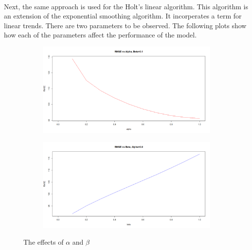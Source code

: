 \documentclass[12pt]{article}
\begin{document}
\paragraph{}
Next, the same approach is used for the Holt's linear algorithm. This algorithm is an extension of the exponential smoothing algorithm. It incorperates a term for linear trends. There are two parameters to be observed. The following plots show how each of the parameters affect the performance of the model.
\begin{figure}[H]
  \centering
  \begin{subfigure}[b]{1\linewidth}
    \includegraphics[width=\linewidth]{figure20-1.png}
  \end{subfigure}
  \begin{subfigure}[b]{1\linewidth}
    \includegraphics[width=\linewidth]{figure20-2.png}
  \end{subfigure}
  \caption{The effects of $\alpha$ and $\beta$}
  \label{fig:figure20}
\end{figure}
\end{document}

